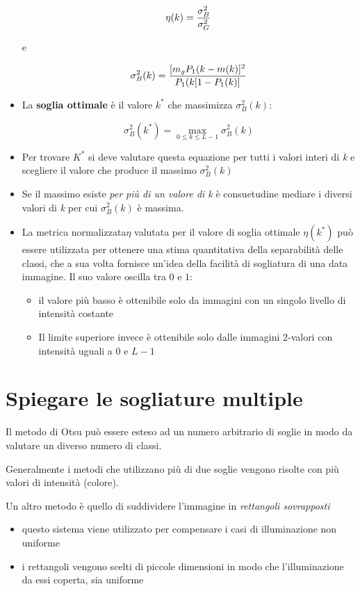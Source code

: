 \begin{itemize}
$$
\eta(k) = {\sigma_{B}^{2} \over \sigma_{G}^{2}}
$$

e

$$
{\sigma_{B}^{2}(k)} = {[{m_g P_1(k} - m(k)]^2 \over {P_1(k}[1 - P_1(k)]}
$$

\item La \textbf{soglia ottimale} è il valore $k^*$ che massimizza $\sigma_{B}^{2}(k)$:

$$
\sigma_{B}^{2}(k^*) = \max_{0 \leq k \leq L-1} \sigma_{B}^{2}(k)
$$

\item Per trovare $K^*$ si deve valutare questa equazione per tutti i valori interi di \textit{k} e scegliere il valore che produce il massimo  $\sigma_{B}^{2}(k)$

\item Se il massimo esiste \textit{per più di un valore di k} è consuetudine mediare i diversi valori di \textit{k} per cui $\sigma_{B}^{2}(k)$ è massima.

\item La metrica normalizzata$\eta$ valutata per il valore di soglia ottimale $\eta(k^*)$ può essere utilizzata per ottenere una stima quantitativa della separabilità delle classi, che a sua volta fornisce un'idea della facilità di
sogliatura di una data immagine. Il suo valore oscilla tra $0$ e $1$:

\begin{itemize}
\item il valore più basso è ottenibile solo da immagini con un singolo livello di intensità costante
\item Il limite superiore invece è ottenibile solo dalle immagini 2-valori con intensità uguali a $0$ e $L-1$
\end{itemize}

\end{itemize}

\section{Spiegare le sogliature multiple}
Il metodo di Otsu può essere esteso ad un numero arbitrario di soglie in modo da valutare un diverso numero di classi.

Generalmente i metodi che utilizzano più di due soglie vengono risolte con più valori di intensità (colore).

Un altro metodo è quello di suddividere l'immagine in \textit{rettangoli sovrapposti}

\begin{itemize}
\item questo sistema viene utilizzato per compensare i casi di illuminazione non uniforme
\item i rettangoli vengono scelti di piccole dimensioni in modo che l'illuminazione da essi coperta, sia uniforme
\end{itemize}


